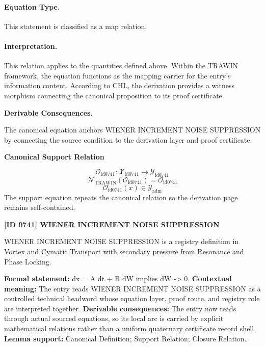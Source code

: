 \paragraph{Equation Type.}
This statement is classified as a map relation.

\paragraph{Interpretation.}
This relation applies to the quantities defined above. Within the TRAWIN framework, the equation functions as the mapping carrier for the entry’s information content. According to CHL, the derivation provides a witness morphism connecting the canonical proposition to its proof certificate.

\par\vspace{0.35em}
\noindent\textbf{Derivable Consequences.}\quad
\begingroup
\footnotesize
\raggedright
The canonical equation anchors WIENER INCREMENT NOISE SUPPRESSION by connecting the source condition to the derivation layer and proof certificate.
\par\endgroup

\noindent\textbf{Canonical Support Relation}\par
\[
\mathcal{O}_{\mathrm{id0741}}:\mathcal{X}_{\mathrm{id0741}}\longrightarrow\mathcal{Y}_{\mathrm{id0741}}
\]
\[
\mathcal{N}_{\mathrm{TRAWIN}}(\mathcal{O}_{\mathrm{id0741}})=\mathcal{O}_{\mathrm{id0741}}
\]
\[
\mathcal{O}_{\mathrm{id0741}}(x)\in\mathcal{Y}_{\mathrm{adm}}
\]
\noindent The support equation repeats the canonical relation so the derivation page remains self-contained.\par

\clearpage
\noindent\textbf{[ID 0741] WIENER INCREMENT NOISE SUPPRESSION}\par
\vspace{0.35em}
\begingroup\small
{}
WIENER INCREMENT NOISE SUPPRESSION is a registry definition in Vortex and Cymatic Transport with secondary pressure from Resonance and Phase Locking.

\begingroup\footnotesize\setlength{\emergencystretch}{3em}\sloppy
\textbf{Formal statement:} dx = A dt + B dW implies dW -> 0. \textbf{Contextual meaning:} The entry reads WIENER INCREMENT NOISE SUPPRESSION as a controlled technical headword whose equation layer, proof route, and registry role are interpreted together. \textbf{Derivable consequences:} The entry now reads through actual sourced equations, so its local arc is carried by explicit mathematical relations rather than a uniform quaternary certificate record shell. \textbf{Lemma support:} Canonical Definition; Support Relation; Closure Relation.\par
\endgroup

